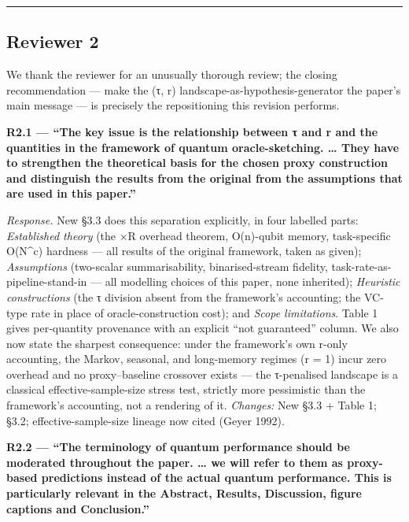 \documentclass[
  11pt,
]{article}
\begin{document}
\begin{center}\rule{0.5\linewidth}{0.5pt}\end{center}

\subsection{Reviewer 2}\label{reviewer-2}

We thank the reviewer for an unusually thorough review; the closing
recommendation --- make the (τ, r) landscape-as-hypothesis-generator the
paper's main message --- is precisely the repositioning this revision
performs.

\textbf{R2.1 --- ``The key issue is the relationship between τ and r and
the quantities in the framework of quantum oracle-sketching. \ldots{}
They have to strengthen the theoretical basis for the chosen proxy
construction and distinguish the results from the original from the
assumptions that are used in this paper.''}

\emph{Response.} New §3.3 does this separation explicitly, in four
labelled parts: \emph{Established theory} (the ×R overhead theorem,
O(n)-qubit memory, task-specific O(N\^{}c) hardness --- all results of
the original framework, taken as given); \emph{Assumptions} (two-scalar
summarisability, binarised-stream fidelity,
task-rate-as-pipeline-stand-in --- all modelling choices of this paper,
none inherited); \emph{Heuristic constructions} (the τ division absent
from the framework's accounting; the VC-type rate in place of
oracle-construction cost); and \emph{Scope limitations}. Table 1 gives
per-quantity provenance with an explicit ``not guaranteed'' column. We
also now state the sharpest consequence: under the framework's own
r-only accounting, the Markov, seasonal, and long-memory regimes (r = 1)
incur zero overhead and no proxy--baseline crossover exists --- the
τ-penalised landscape is a classical effective-sample-size stress test,
strictly more pessimistic than the framework's accounting, not a
rendering of it. \emph{Changes:} New §3.3 + Table 1; §3.2;
effective-sample-size lineage now cited (Geyer 1992).

\textbf{R2.2 --- ``The terminology of quantum performance should be
moderated throughout the paper. \ldots{} we will refer to them as
proxy-based predictions instead of the actual quantum performance. This
is particularly relevant in the Abstract, Results, Discussion, figure
captions and Conclusion.''}
\end{document}
